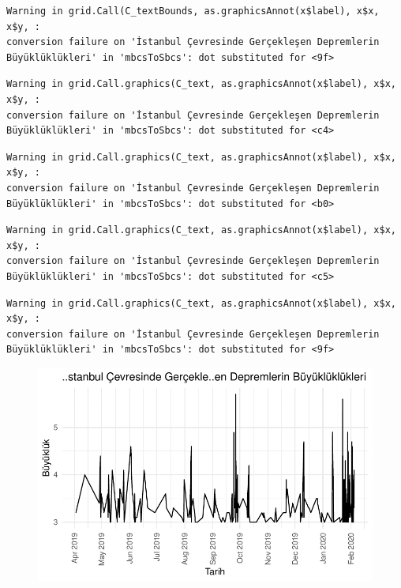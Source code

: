\documentclass[
  11pt,
  a4paper,
  DIV=11,
  numbers=noendperiod]{scrartcl}
\begin{document}
\begin{verbatim}
Warning in grid.Call(C_textBounds, as.graphicsAnnot(x$label), x$x, x$y, :
conversion failure on 'İstanbul Çevresinde Gerçekleşen Depremlerin
Büyüklüklükleri' in 'mbcsToSbcs': dot substituted for <9f>
\end{verbatim}

\begin{verbatim}
Warning in grid.Call.graphics(C_text, as.graphicsAnnot(x$label), x$x, x$y, :
conversion failure on 'İstanbul Çevresinde Gerçekleşen Depremlerin
Büyüklüklükleri' in 'mbcsToSbcs': dot substituted for <c4>
\end{verbatim}

\begin{verbatim}
Warning in grid.Call.graphics(C_text, as.graphicsAnnot(x$label), x$x, x$y, :
conversion failure on 'İstanbul Çevresinde Gerçekleşen Depremlerin
Büyüklüklükleri' in 'mbcsToSbcs': dot substituted for <b0>
\end{verbatim}

\begin{verbatim}
Warning in grid.Call.graphics(C_text, as.graphicsAnnot(x$label), x$x, x$y, :
conversion failure on 'İstanbul Çevresinde Gerçekleşen Depremlerin
Büyüklüklükleri' in 'mbcsToSbcs': dot substituted for <c5>
\end{verbatim}

\begin{verbatim}
Warning in grid.Call.graphics(C_text, as.graphicsAnnot(x$label), x$x, x$y, :
conversion failure on 'İstanbul Çevresinde Gerçekleşen Depremlerin
Büyüklüklükleri' in 'mbcsToSbcs': dot substituted for <9f>
\end{verbatim}

\begin{figure}[H]

{\centering \includegraphics{project_files/figure-pdf/unnamed-chunk-17-1.pdf}

}

\end{figure}
\end{document}
